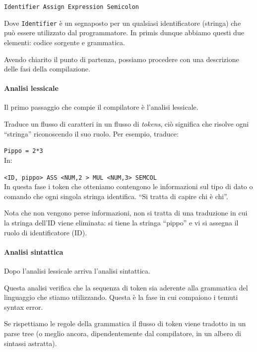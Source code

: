 \documentclass[class=book, crop=false, oneside]{standalone}
\begin{document}
\texttt{Identifier Assign Expression Semicolon}

Dove \texttt{Identifier} è un segnaposto per un qualsiasi identificatore (stringa) che può essere utilizzato dal programmatore.
In primis dunque abbiamo questi due elementi: codice sorgente e grammatica.

Avendo chiarito il punto di partenza, possiamo procedere con una descrizione delle fasi della compilazione.

\paragraph{Analisi lessicale}
Il primo passaggio che compie il compilatore è l’analisi lessicale.

Traduce un flusso di caratteri in un flusso di \emph{tokens}, ciò significa che risolve ogni “stringa” riconoscendo il suo ruolo. Per esempio, traduce:

\texttt{Pippo = 2*3}\\
In:

\texttt{<ID, pippo> ASS <NUM,2 > MUL <NUM,3> SEMCOL}\\
In questa fase i token che otteniamo contengono le informazioni sul tipo di dato o comando che ogni singola stringa identifica. “Si tratta di capire chi è chi”.

Nota che non vengono perse informazioni, non si tratta di una traduzione in cui la stringa dell’ID viene eliminata: si tiene la stringa “pippo” e vi si assegna il ruolo di identificatore (ID).

\paragraph{Analisi sintattica}
Dopo l’analisi lessicale arriva l’analisi sintattica.

Questa analisi verifica che la sequenza di token sia aderente alla grammatica del linguaggio che stiamo utilizzando. Questa è la fase in cui compaiono i temuti syntax error.

Se rispettiamo le regole della grammatica il flusso di token viene tradotto in un parse tree (o meglio ancora, dipendentemente dal compilatore, in un albero di sintassi astratta).
\end{document}
